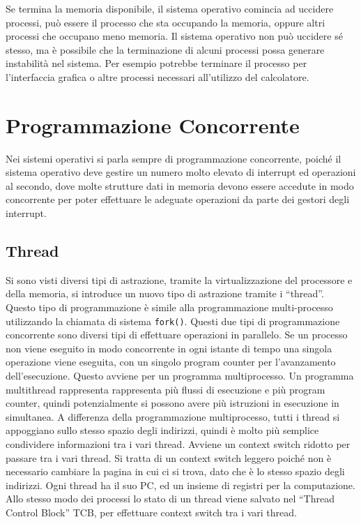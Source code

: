 \documentclass{article}
\numberwithin{equation}{subsection}
\begin{document}
Se termina la memoria disponibile, il sistema operativo comincia ad uccidere processi, può essere il processo che sta occupando la memoria, oppure 
altri processi che occupano meno memoria. Il sistema operativo non può uccidere sé stesso, ma è possibile che la terminazione di alcuni processi 
possa generare instabilità nel sistema. Per esempio potrebbe terminare il processo per l'interfaccia grafica o altre processi necessari all'utilizzo del calcolatore. 


\clearpage

\section{Programmazione Concorrente}

Nei sistemi operativi si parla sempre di programmazione concorrente, poiché il sistema operativo deve gestire un numero molto elevato di interrupt ed operazioni al secondo, 
dove molte strutture dati in memoria devono essere accedute in modo concorrente per poter effettuare le adeguate operazioni da parte dei gestori degli interrupt. 

\subsection{Thread}

Si sono visti diversi tipi di astrazione, tramite la virtualizzazione del processore e della memoria, si introduce un nuovo tipo di astrazione tramite i ``thread''. Questo tipo 
di programmazione è simile alla programmazione multi-processo utilizzando la chiamata di 
sistema \verb|fork()|. Questi due tipi di programmazione concorrente sono diversi tipi di effettuare operazioni in parallelo. Se un processo non viene eseguito in 
modo concorrente in ogni istante di tempo una singola operazione viene eseguita, con un singolo program counter per l'avanzamento dell'esecuzione. Questo avviene per un programma multiprocesso. 
Un programma multithread rappresenta rappresenta più flussi di esecuzione e più program counter, quindi potenzialmente si possono avere più istruzioni in esecuzione in simultanea. 
A differenza della programmazione multiprocesso, tutti i thread si appoggiano sullo stesso spazio degli indirizzi, quindi è molto più semplice condividere informazioni 
tra i vari thread. Avviene un context switch ridotto per passare tra i vari thread. Si tratta di un context switch leggero poiché non è necessario cambiare la pagina 
in cui ci si trova, dato che è lo stesso spazio degli indirizzi. Ogni thread ha il suo PC, ed un insieme di registri per la computazione. Allo stesso modo dei processi 
lo stato di un thread viene salvato nel ``Thread Control Block'' TCB, per effettuare context switch tra i vari thread. 
\end{document}
